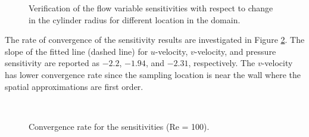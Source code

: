 \begin{figure}[H]
{    }
    \quad
    \caption{Verification of the flow variable sensitivities with respect to change in the cylinder radius for different location in the domain.}
    \label{fig:C4_flowOverCylinderSensitivityValidation}
\end{figure}
%
The rate of convergence of the sensitivity results are investigated in Figure \ref{fig:C4_flowOverCylinderSArateOfConvergence}. The slope of the fitted line (dashed line) for $u$-velocity, $v$-velocity, and pressure sensitivity are reported as $-2.2$, $-1.94$, and $-2.31$, respectively. The $v$-velocity has lower convergence rate since the sampling location is near the wall where the spatial approximations are first order.
%
\begin{figure}[H]
    \centering
    \quad
    \\
    \caption{Convergence rate for the sensitivities (Re = 100).}
    \label{fig:C4_flowOverCylinderSArateOfConvergence}
\end{figure}
